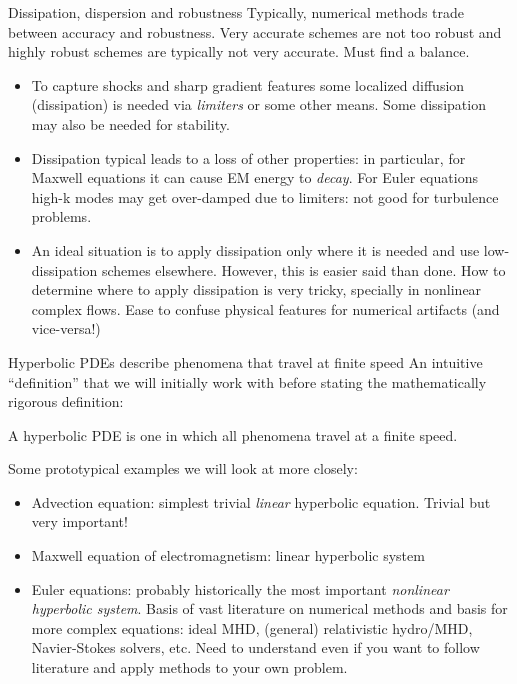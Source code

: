 \documentclass[aspectratio=169]{beamer}
\newcommand{\mypause}{}
\begin{document}
\begin{frame}{Dissipation, dispersion and robustness}
  Typically, numerical methods trade between accuracy and
  robustness. Very accurate schemes are not too robust and highly
  robust schemes are typically not very accurate. Must find a balance.
  \mypause%
  \begin{itemize}
  \item To capture shocks and sharp gradient features some localized
    diffusion (dissipation) is needed via \emph{limiters} or some
    other means. Some dissipation may also be needed for stability.
  \item Dissipation typical leads to a loss of other properties: in
    particular, for Maxwell equations it can cause EM energy to
    \emph{decay}. For Euler equations high-k modes may get over-damped
    due to limiters: not good for turbulence problems.%
    \mypause%
  \item An ideal situation is to apply dissipation only where it is
    needed and use low-dissipation schemes elsewhere. However, this is
    easier said than done. How to determine where to apply dissipation
    is very tricky, specially in nonlinear complex flows. Ease to
    confuse physical features for numerical artifacts (and
    vice-versa!)
  \end{itemize}
\end{frame}

\begin{frame}{Hyperbolic PDEs describe phenomena that travel at finite
    speed}
  \small%
  An intuitive ``definition'' that we will initially work with before
  stating the mathematically rigorous definition:
  \begin{definition}
    A hyperbolic PDE is one in which all phenomena travel at a finite
    speed.
  \end{definition}

  \mypause%
  \vskip0.1in%
  Some prototypical examples we will look at more closely:
  \begin{itemize}
  \item Advection equation: simplest trivial \emph{linear} hyperbolic
    equation. Trivial but very important!
  \item Maxwell equation of electromagnetism: linear hyperbolic system
  \item Euler equations: probably historically the most important
    \emph{nonlinear hyperbolic system}. Basis of vast literature on
    numerical methods and basis for more complex equations: ideal MHD,
    (general) relativistic hydro/MHD, Navier-Stokes solvers, etc. Need
    to understand even if you want to follow literature and apply
    methods to your own problem.
  \end{itemize}
  
\end{frame}
\end{document}
